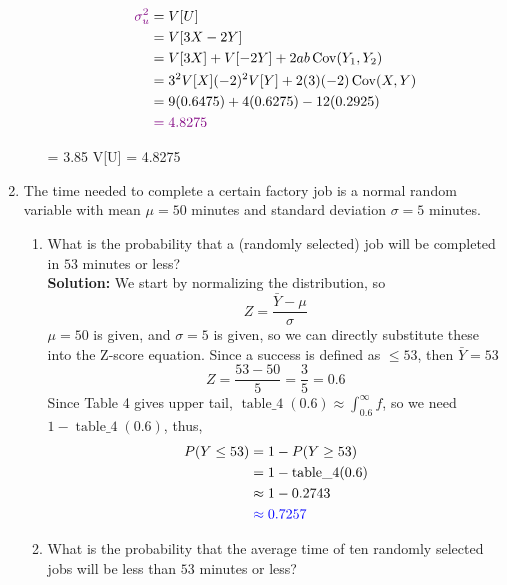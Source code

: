 \documentclass[12pt]{article}
\newcommand*\widefbox[1]{\fbox{\hspace{2em}#1\hspace{2em}}}
\newcommand{\ybar}{\bar{Y}}
\begin{document}
\begin{enumerate}
\begin{enumerate}
\begin{align}
            \color{violet}\sigma^2_u\color{black} &= V[U] \notag\\
            &= V[3X-2Y] \notag\\
            &= V[3X] + V[-2Y] + 2ab \operatorname{Cov}(Y_1,Y_2) \notag\\
            &= 3^2V[X] (-2)^2 V[Y] + 2(3)(-2) \operatorname{Cov}(X,Y) \notag\\
            &= 9(0.6475) + 4(0.6275) - 12(0.2925) \notag\\
            & \color{violet} = 4.8275 \notag
        \end{align}
        \begin{empheq}[box=\widefbox]{align}
        \color{blue} E[U] = 3.85 \hspace{1.5in} V[U] = 4.8275 \notag
        \end{empheq}
    \end{enumerate}
    \newpage
    \item The time needed to complete a certain factory job is a normal random variable with mean $\mu = 50$ minutes and standard deviation $\sigma = 5$ minutes.
    \begin{enumerate}
        \item What is the probability that a (randomly selected) job will be completed in $53$ minutes or less?
        \vspace{0.15in}\\
        \textbf{Solution:} We start by normalizing the distribution, so
        $$Z = \frac{\ybar - \mu}{\sigma}$$
        $\mu = 50$ is given, and $\sigma = 5$ is given, so we can directly substitute these into the Z-score equation. Since a success is defined as $\leq 53$, then $\ybar = 53$
        $$Z = \frac{53 - 50}{5} = \frac{3}{5} = 0.6$$
        Since Table 4 gives upper tail, $\operatorname{table\_4}(0.6) \approx \int_{0.6}^{\infty}f$, so we need $1-\operatorname{table\_4}(0.6)$, thus,
        \begin{align}
            P(Y \leq 53) &= 1 - P(Y \geq 53) \notag\\
            &= 1 - \operatorname{table\_4}(0.6)\notag\\
            &\approx 1 - 0.2743 \notag\\
            & \color{blue}\approx 0.7257 \notag
        \end{align}
        \vspace{0.15in}
        \item What is the probability that the average time of ten randomly selected jobs will be less than $53$ minutes or less?\vspace{0.15in}\\

\end{enumerate}
\end{enumerate}
\end{document}

